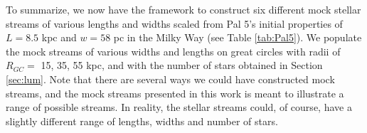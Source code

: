\documentclass[twocolumn]{aastex62}
\newcommand{\todo}[1]{{\color{red} TODO: #1}}
\begin{document}
To summarize, we now have the framework to construct six different mock stellar streams of various lengths and widths scaled from Pal 5's initial properties of $L = 8.5$ kpc and $w = 58$ pc in the Milky Way (see Table \ref{tab:Pal5}). We populate the mock streams of various widths and lengths on great circles with radii of $R_{GC} =$ 15, 35, 55 kpc, and with the number of stars obtained in Section \ref{sec:lum}. Note that there are several ways we could have constructed mock streams, and the mock streams presented in this work is meant to illustrate a range of possible streams. In reality, the stellar streams could, of course, have a slightly different range of lengths, widths and number of stars.




%
\end{document}
